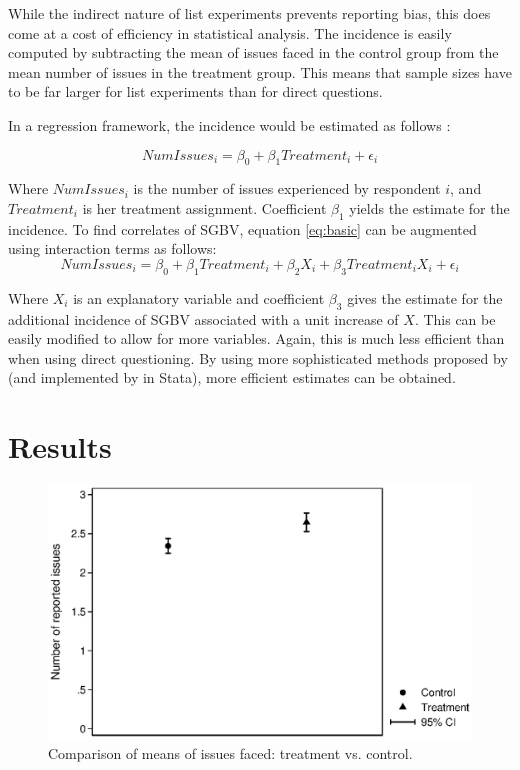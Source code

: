 While the indirect nature of list experiments prevents reporting bias, this does come at a cost of efficiency in statistical analysis. The incidence is easily computed by subtracting the mean of issues faced in the control group from the mean number of issues in the treatment group. This means that sample sizes have to be far larger for list experiments than for direct questions. 

In a regression framework, the incidence would be estimated as follows \citep{Holbrook2010}:

\begin{equation}
\label{eq:basic}
NumIssues_i = \beta_0 + \beta_1 Treatment_i + \epsilon_i
\end{equation}

Where \(NumIssues_i\) is the number of issues experienced by respondent $i$, and \(Treatment_i\) is her treatment assignment. Coefficient \(\beta_1\) yields the estimate for the incidence. To find correlates of SGBV, equation \ref{eq:basic} can be augmented using interaction terms as follows: 
\begin{equation}
\label{eq:congogbv:interaction}
NumIssues_i = \beta_0 + \beta_1 Treatment_i + \beta_2 X_i + \beta_3 Treatment_i X_i + \epsilon_i
\end{equation}

Where \(X_i\) is an explanatory variable and coefficient \(\beta_3\) gives the estimate for the additional incidence of SGBV associated with a unit increase of \(X\). This can be easily modified to allow for more variables. Again, this is much less efficient than when using direct questioning. By using more sophisticated methods proposed by \citet{Imai2011} (and implemented by \cite{Tsai2019} in Stata), more efficient estimates can be obtained. 




\section{Results}


\begin{figure}[htb]
	\begin{center}
  \includegraphics[width=0.6\linewidth]{chapters/congogbv/figures/meancompare_overall.eps}
  \caption{Comparison of means of issues faced: treatment vs. control.}
  \label{fig:meancompare_overall}
  \end{center}
\end{figure}

